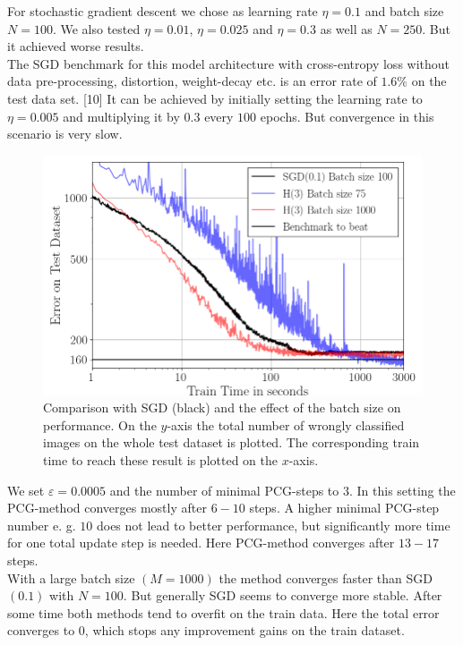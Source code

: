 \documentclass[conference]{IEEEtran}
\begin{document}
	\noindent
	For stochastic gradient descent we chose as learning rate $\eta=0.1$ and batch size $N=100$. We also tested $\eta=0.01$, $\eta=0.025$ and $\eta=0.3$ as well as $N=250$. But it achieved worse results. \\
	The SGD benchmark for this model architecture with cross-entropy loss without data pre-processing, distortion, weight-decay etc. is an error rate of $1.6\%$ on the test data set. [10] 
	It can be achieved by initially setting the learning rate to $\eta=0.005$ and multiplying it by $0.3$ every $100$ epochs. But convergence in this scenario is very slow.	
	\begin{figure}[htbp]
		\centerline{\includegraphics[scale=0.52]{Plot_Batch_size.png}}
		\caption{Comparison with SGD (black) and the effect of the batch size on performance. On the $y$-axis the total number of wrongly classified images on the whole test dataset is plotted. The corresponding train time to reach these result is plotted on the $x$-axis.}
		\label{fig}
	\end{figure}	
	\noindent
	We set $\varepsilon=0.0005$ and the number of minimal PCG-steps to $3$. In this setting the PCG-method converges mostly after $6-10$ steps. A higher minimal PCG-step number e. g. $10$ does not lead to better performance, but significantly more time for one total update step is needed. Here PCG-method converges after $13-17$ steps.\\
	With a large batch size $(M=1000)$ the method converges faster than SGD$(0.1)$ with $N=100.$ But generally SGD seems to converge more stable. After some time both methods tend to overfit on the train data. Here the total error converges to $0$, which stops any improvement gains on the train dataset.\\
\end{document}
